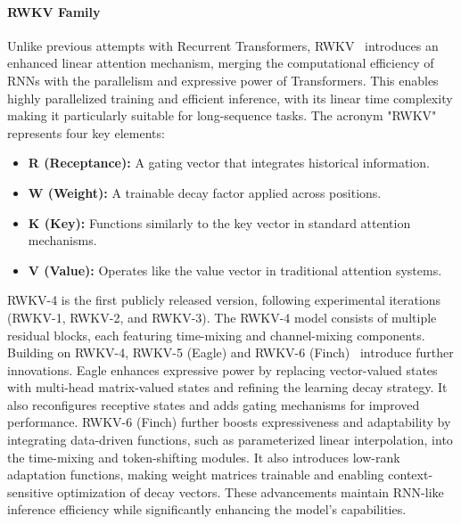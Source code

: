 \documentclass[11pt, a4paper, logo, copyright, nonumbering]{map}
\begin{document}
\paragraph{RWKV Family} Unlike previous attempts with Recurrent Transformers, RWKV~\citep{peng2023rwkvreinventingrnnstransformer} introduces an enhanced linear attention mechanism, merging the computational efficiency of RNNs with the parallelism and expressive power of Transformers. This enables highly parallelized training and efficient inference, with its linear time complexity making it particularly suitable for long-sequence tasks.  The acronym "RWKV" represents four key elements:
\begin{itemize}
    \item \textbf{R (Receptance):} A gating vector that integrates historical information.
    \item \textbf{W (Weight):} A trainable decay factor applied across positions.
    \item \textbf{K (Key):} Functions similarly to the key vector in standard attention mechanisms.
    \item \textbf{V (Value):} Operates like the value vector in traditional attention systems.
\end{itemize}

RWKV-4 is the first publicly released version, following experimental iterations (RWKV-1, RWKV-2, and RWKV-3). The RWKV-4 model consists of multiple residual blocks, each featuring time-mixing and channel-mixing components.
Building on RWKV-4, RWKV-5 (Eagle) and RWKV-6 (Finch)~\citep{peng2024eaglefinchrwkvmatrixvalued} introduce further innovations. Eagle enhances expressive power by replacing vector-valued states with multi-head matrix-valued states and refining the learning decay strategy. It also reconfigures receptive states and adds gating mechanisms for improved performance.
 RWKV-6 (Finch) further boosts expressiveness and adaptability by integrating data-driven functions, such as parameterized linear interpolation, into the time-mixing and token-shifting modules. It also introduces low-rank adaptation functions, making weight matrices trainable and enabling context-sensitive optimization of decay vectors. These advancements maintain RNN-like inference efficiency while significantly enhancing the model's capabilities.
\end{document}
